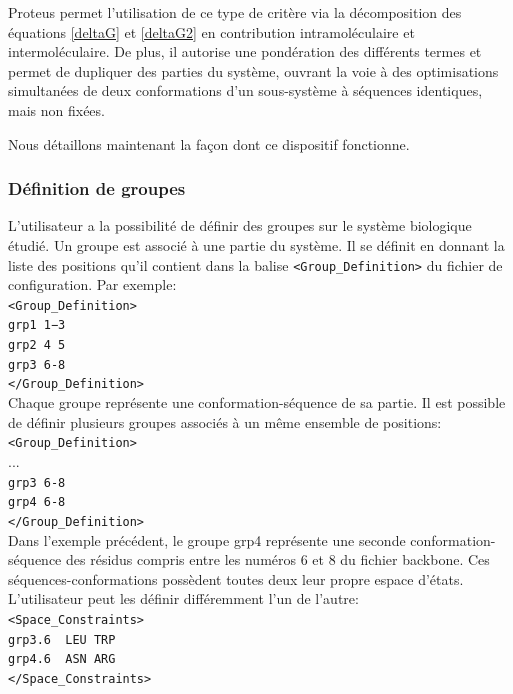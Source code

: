 Proteus permet l'utilisation de ce type de critère via la décomposition des équations \ref{deltaG} et \ref{deltaG2} en contribution intramoléculaire et intermoléculaire. De plus, il autorise une pondération des différents termes et permet de dupliquer des parties du système, ouvrant la voie à des optimisations simultanées de deux conformations d'un sous-système à séquences identiques, mais non fixées.   

Nous détaillons maintenant la façon dont ce dispositif fonctionne.

\subsubsection{Définition de groupes}
\label{sub:group}
L'utilisateur a la possibilité de définir des groupes sur le système biologique étudié. Un groupe est associé à une partie du système. Il se définit en donnant la liste des positions qu'il contient dans la balise \verb!<Group_Definition>! du fichier de configuration. Par exemple:\\
\verb!<Group_Definition>! \\
\verb!grp1 1−3! \\
\verb!grp2 4 5! \\
\verb!grp3 6-8! \\
\verb!</Group_Definition>! \\

Chaque groupe représente une conformation-séquence de sa partie. Il est possible de définir plusieurs groupes associés à un même ensemble de positions:\\

\verb!<Group_Definition>! \\
... \\
\verb!grp3 6-8! \\
\verb!grp4 6-8! \\
\verb!</Group_Definition>! \\

Dans l'exemple précédent, le groupe grp4 représente une seconde conformation-séquence des résidus compris entre les numéros 6 et 8 du fichier backbone. Ces séquences-conformations possèdent toutes deux leur propre espace d'états. L'utilisateur peut les définir différemment l'un de l'autre:\\
\verb!<Space_Constraints>! \\
\verb!grp3.6  LEU TRP! \\
\verb!grp4.6  ASN ARG!  \\
\verb!</Space_Constraints>! \\

